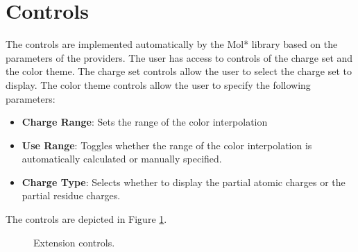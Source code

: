 \documentclass[
  digital,     %
  oneside,     %
  nosansbold,  %
  nocolorbold, %
  lof,         %
  lot,         %
]{fithesis4}
\begin{document}
\section{Controls}
\label{section:controls}

The controls are implemented automatically by the Mol* library based on the parameters of the providers. The user has access to controls of the charge set and the color theme. The charge set controls allow the user to select the charge set to display. The color theme controls allow the user to specify the following parameters:

\begin{itemize}
  \item \textbf{Charge Range}: Sets the range of the color interpolation
  \item \textbf{Use Range}: Toggles whether the range of the color interpolation is automatically calculated or manually specified.
  \item \textbf{Charge Type}: Selects whether to display the partial atomic charges or the partial residue charges.
\end{itemize}

The controls are depicted in Figure \ref{fig:controls-charge-set}.

\begin{figure}[htbp]
  \centering
  \caption{Extension controls.}
  \label{fig:controls-charge-set}
\end{figure}
\end{document}
